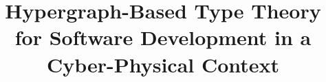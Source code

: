\documentclass[10pt]{article}
\begin{document}
\title{Hypergraph-Based Type Theory 
for Software Development in a Cyber-Physical Context}
\end{document}
